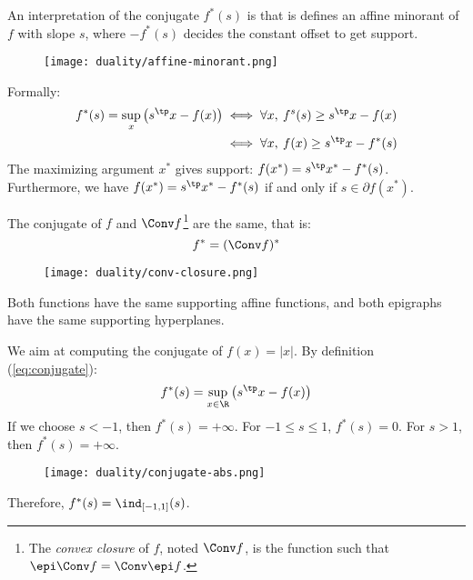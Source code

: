 An interpretation of the conjugate $f^*(s)$ is that is defines an affine minorant of $f$ with slope $s$, where $-f^*(s)$ decides the constant offset to get support.
\begin{figure}[H]
    \centering
    \texttt{[image: duality/affine-minorant.png]}
\end{figure}
Formally:
\begin{align*}
    f^*(s) = \sup_x\left(s^\tp x-f(x)\right) 
    &\iff \forall x, \: f^s(s) \geq s^\tp x - f(x)\\
    &\iff \forall x, \: f(x) \geq s^\tp x - f^*(s)
\end{align*}
The maximizing argument $x^*$ gives support: $f(x^*)=s^\tp x^*-f^*(s)$. Furthermore, we have $f(x^*)=s^\tp x^*-f^*(s)$ if and only if $s\in\partial f(x^*)$.

\begin{property}
    The conjugate of $f$ and $\Conv f$\footnote{The \emph{convex closure} of $f$, noted $\Conv f$, is the function such that $\epi \Conv f=\Conv\epi f$.} are the same, that is:
    \begin{equation*}
        f^* = (\Conv f)^*
    \end{equation*}
    \begin{figure}[H]
        \centering
        \texttt{[image: duality/conv-closure.png]}
    \end{figure}
    Both functions have the same supporting affine functions, and both epigraphs have the same supporting hyperplanes.
\end{property}

\begin{example}
    We aim at computing the conjugate of $f(x)=|x|$. By definition (\autoref{eq:conjugate}):
    \begin{equation*}
        f^*(s) = \sup_{x\in\R}\left(s^\tp x-f(x)\right)
    \end{equation*}
    If we choose $s<-1$, then $f^*(s)=+\infty$. For $-1\leq s\leq 1$, $f^*(s)=0$. For $s>1$, then $f^*(s)=+\infty$.
    \begin{figure}[H]
        \centering
        \texttt{[image: duality/conjugate-abs.png]}
    \end{figure}
    Therefore, $f^*(s)=\ind_{[-1, 1]}(s)$.
\end{example}

